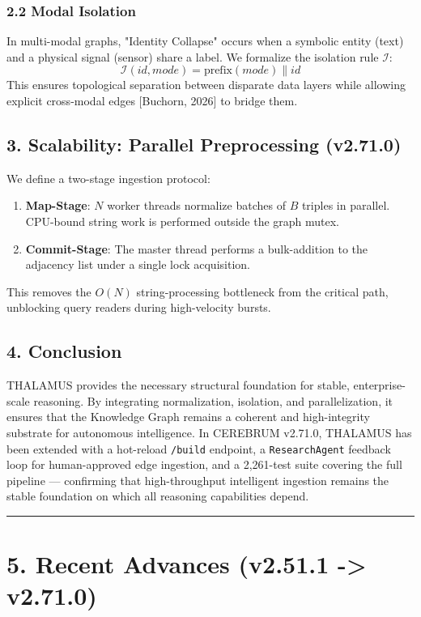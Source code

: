 \subsubsection*{2.2 Modal Isolation}
In multi-modal graphs, "Identity Collapse" occurs when a symbolic entity (text) and a physical signal (sensor) share a label. We formalize the isolation rule $\mathcal{I}$:
$$\mathcal{I}(id, mode) = \text{prefix}(mode) \mathbin{\|} id$$
This ensures topological separation between disparate data layers while allowing explicit cross-modal edges [Buchorn, 2026] to bridge them.

\subsection*{3. Scalability: Parallel Preprocessing (v2.71.0)}
We define a two-stage ingestion protocol:
\begin{enumerate}
  \item  \textbf{Map-Stage}: $N$ worker threads normalize batches of $B$ triples in parallel. CPU-bound string work is performed outside the graph mutex.
  \item  \textbf{Commit-Stage}: The master thread performs a bulk-addition to the adjacency list under a single lock acquisition.
\end{enumerate}

This removes the $O(N)$ string-processing bottleneck from the critical path, unblocking query readers during high-velocity bursts.

\subsection*{4. Conclusion}
THALAMUS provides the necessary structural foundation for stable, enterprise-scale reasoning. By integrating normalization, isolation, and parallelization, it ensures that the Knowledge Graph remains a coherent and high-integrity substrate for autonomous intelligence. In CEREBRUM v2.71.0, THALAMUS has been extended with a hot-reload \texttt{/build} endpoint, a \texttt{ResearchAgent} feedback loop for human-approved edge ingestion, and a 2,261-test suite covering the full pipeline --- confirming that high-throughput intelligent ingestion remains the stable foundation on which all reasoning capabilities depend.

\medskip\noindent\rule{\linewidth}{0.4pt}\medskip

\section*{5. Recent Advances (v2.51.1 -> v2.71.0)}

